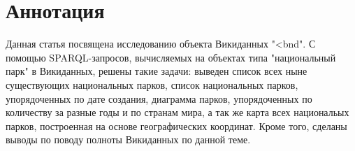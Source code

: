 \section{Аннотация}

Данная статья посвящена исследованию объекта Викиданных "<bnd". С помощью SPARQL-запросов, вычисляемых на объектах типа "национальный парк" в Викиданных, решены такие задачи: выведен список всех ныне существующих национальных парков, список национальных парков, упорядоченных по дате создания, диаграмма парков, упорядоченных по количеству за разные годы и по странам мира, а так же карта всех национальых парков, построенная на основе географических координат. Кроме того, сделаны выводы по поводу полноты Викиданных по данной теме.